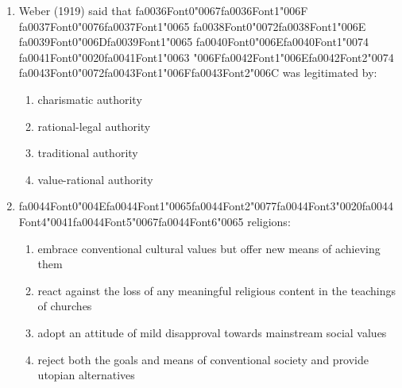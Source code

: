 \documentclass[12pt]{article}
\begin{document}
\begin{enumerate}[label=\arabic*.]
\begin{enumerate}[label=(\alph*)]
    \item the proportion of people living alone has fallen to 29\%
    \item many people are cohabiting in long term relationships
    \item the upward curve of remarriages compensates for the drop in first marriages
    \item all of the above
\end{enumerate}
\item Weber (1919) said that {\csname fa0036Font0\endcsname\char"0067}{\csname fa0036Font1\endcsname\char"006F} {\csname fa0037Font0\endcsname\char"0076}{\csname fa0037Font1\endcsname\char"0065} {\csname fa0038Font0\endcsname\char"0072}{\csname fa0038Font1\endcsname\char"006E} {\csname fa0039Font0\endcsname\char"006D}{\csname fa0039Font1\endcsname\char"0065} {\csname fa0040Font0\endcsname\char"006E}{\csname fa0040Font1\endcsname\char"0074} {\csname fa0041Font0\endcsname\char"0020}{\csname fa0041Font1\endcsname\char"0063} {\char"006F}{\csname fa0042Font1\endcsname\char"006E}{\csname fa0042Font2\endcsname\char"0074} {\csname fa0043Font0\endcsname\char"0072}{\csname fa0043Font1\endcsname\char"006F}{\csname fa0043Font2\endcsname\char"006C} was legitimated by:
\begin{enumerate}[label=(\alph*)]
    \item charismatic authority
    \item rational-legal authority
    \item traditional authority
    \item value-rational authority
\end{enumerate}
\item {\csname fa0044Font0\endcsname\char"004E}{\csname fa0044Font1\endcsname\char"0065}{\csname fa0044Font2\endcsname\char"0077}{\csname fa0044Font3\endcsname\char"0020}{\csname fa0044Font4\endcsname\char"0041}{\csname fa0044Font5\endcsname\char"0067}{\csname fa0044Font6\endcsname\char"0065} religions:
\begin{enumerate}[label=(\alph*)]
    \item embrace conventional cultural values but offer new means of achieving them
    \item react against the loss of any meaningful religious content in the teachings of churches
    \item adopt an attitude of mild disapproval towards mainstream social values
    \item reject both the goals and means of conventional society and provide utopian alternatives

\end{enumerate}
\end{enumerate}
\end{document}
